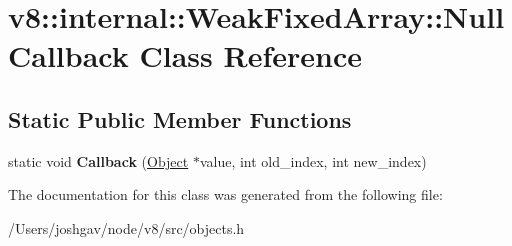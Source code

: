 \hypertarget{classv8_1_1internal_1_1_weak_fixed_array_1_1_null_callback}{}\section{v8\+:\+:internal\+:\+:Weak\+Fixed\+Array\+:\+:Null\+Callback Class Reference}
\label{classv8_1_1internal_1_1_weak_fixed_array_1_1_null_callback}
\subsection*{Static Public Member Functions}
\begin{DoxyCompactItemize}
\item 
static void {\bfseries Callback} (\hyperlink{classv8_1_1internal_1_1_object}{Object} $\ast$value, int old\+\_\+index, int new\+\_\+index)\hypertarget{classv8_1_1internal_1_1_weak_fixed_array_1_1_null_callback_a4249eb4c02e2b192d7f8610e829aad8d}{}\label{classv8_1_1internal_1_1_weak_fixed_array_1_1_null_callback_a4249eb4c02e2b192d7f8610e829aad8d}

\end{DoxyCompactItemize}


The documentation for this class was generated from the following file\+:\begin{DoxyCompactItemize}
\item 
/\+Users/joshgav/node/v8/src/objects.\+h\end{DoxyCompactItemize}
